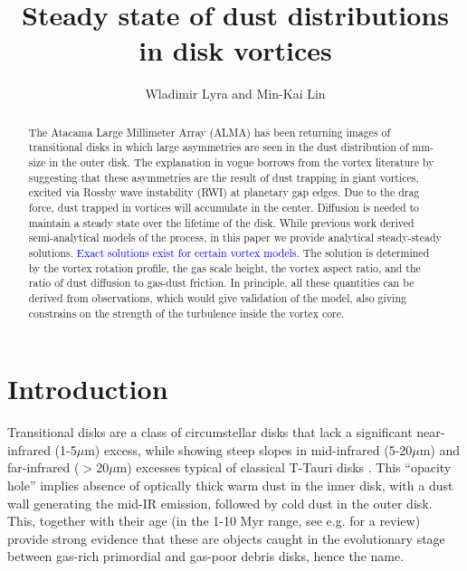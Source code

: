 \documentclass[apj]{emulateapj}
\def\blue#1{\textcolor{blue}{#1}}
\begin{document}
\title{Steady state of dust distributions in disk vortices}
\author{Wladimir Lyra and Min-Kai Lin}

\begin{abstract}
The Atacama Large Millimeter Array (ALMA) has been  returning images of transitional disks in which large asymmetries are seen in the dust distribution of 
mm-size in the outer disk. The explanation in vogue borrows from the vortex literature by suggesting 
that these asymmetries are the result of dust trapping in giant vortices, excited via Rossby wave instability (RWI) 
at planetary gap edges. Due to the drag force, dust trapped in vortices will accumulate 
in the center. Diffusion is needed to maintain a steady state over the lifetime of the disk. While previous work 
derived semi-analytical models of the process, in this paper we
provide analytical steady-steady solutions. \blue{Exact solutions exist for certain vortex models.}
The solution is determined by the vortex rotation profile, the gas scale height, the 
vortex aspect ratio, and the ratio of dust diffusion to gas-dust friction. In principle, all these quantities can be derived
from observations, which would give validation of the model, also giving constrains on the strength of the turbulence 
inside the vortex core.
\end{abstract}

\section{Introduction}
\label{sect:introduction}

Transitional disks are a class of circumstellar disks that lack a
significant near-infrared (1-5$\mu$m) excess, while showing steep
slopes in mid-infrared (5-20$\mu$m) and
far-infrared ($>$20$\mu$m) excesses typical of classical T-Tauri disks
\citep{Strom89,Skrutskie90,Gauvin-Strom92,Wolk-Walter96,Calvet02,Calvet05,Muzerolle06,Sicilia06,Currie09,Currie-Sicilia11}. 
This ``opacity hole''  implies absence of optically thick warm dust in the inner disk, with a dust
wall generating the mid-IR emission, followed by cold dust in the
outer disk.  This, together with their age (in the 1-10 Myr range, see
e.g. \citealt{Currie10} for a review) provide strong evidence that these are
objects caught in the evolutionary stage between gas-rich 
primordial and gas-poor debris disks, hence the name. 
\end{document}

